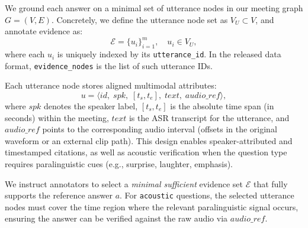 We ground each answer on a minimal set of utterance nodes in our meeting graph $G=(V,E)$. Concretely, we define the utterance node set as $V_U \subset V$, and annotate evidence as:
\begin{equation}
\mathcal{E} = \{u_i\}_{i=1}^{m}, \quad u_i \in V_U,
\end{equation}
where each $u_i$ is uniquely indexed by its \texttt{utterance\_id}. In the released data format, \texttt{evidence\_nodes} is the list of such utterance IDs.

Each utterance node stores aligned multimodal attributes:
\begin{equation}
u = \langle id,\; spk,\; [t_s,t_e],\; text,\; audio\_ref \rangle,
\end{equation}
where $spk$ denotes the speaker label, $[t_s,t_e]$ is the absolute time span (in seconds) within the meeting, $text$ is the ASR transcript for the utterance, and $audio\_ref$ points to the corresponding audio interval (offsets in the original waveform or an external clip path). This design enables speaker-attributed and timestamped citations, as well as acoustic verification when the question type requires paralinguistic cues (e.g., surprise, laughter, emphasis).


We instruct annotators to select a \emph{minimal sufficient} evidence set $\mathcal{E}$ that fully supports the reference answer $a$. For \texttt{acoustic} questions, the selected utterance nodes must cover the time region where the relevant paralinguistic signal occurs, ensuring the answer can be verified against the raw audio via $audio\_ref$.